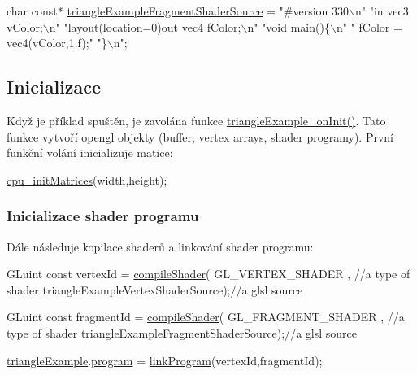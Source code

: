 \begin{DoxyCodeInclude}
\textcolor{keywordtype}{char} \textcolor{keyword}{const}* \hyperlink{triangleExample_8c_a48b175665aab439caedaa0440a85462e}{triangleExampleFragmentShaderSource} = 
\textcolor{stringliteral}{"#version 330\(\backslash\)n"}
\textcolor{stringliteral}{"in vec3 vColor;\(\backslash\)n"}
\textcolor{stringliteral}{"layout(location=0)out vec4 fColor;\(\backslash\)n"}
\textcolor{stringliteral}{"void main()\{\(\backslash\)n"}
\textcolor{stringliteral}{"  fColor = vec4(vColor,1.f);"}
\textcolor{stringliteral}{"\}\(\backslash\)n"};
\end{DoxyCodeInclude}
\hypertarget{triangleExample.c_Initialization}{}\subsection{Inicializace}\label{triangleExample.c_Initialization}
Když je příklad spuštěn, je zavolána funkce \hyperlink{triangleExample_8c_a73184b4ab6bb513ad9a9a4c36e92646b}{triangle\-Example\-\_\-on\-Init()}. Tato funkce vytvoří opengl objekty (buffer, vertex arrays, shader programy). První funkční volání inicializuje matice\-: 
\begin{DoxyCodeInclude}
  \hyperlink{mouseCamera_8c_a7e7e918a9328502b7c35cfbbdb068b7b}{cpu\_initMatrices}(width,height);
\end{DoxyCodeInclude}
\hypertarget{triangleExample.c_ShaderProgram}{}\subsubsection{Inicializace shader programu}\label{triangleExample.c_ShaderProgram}
Dále následuje kopilace shaderů a linkování shader programu\-: 
\begin{DoxyCodeInclude}
  GLuint \textcolor{keyword}{const} vertexId = \hyperlink{program_8h_aeeb65abe90cc1be97e5788afe8ca57a7}{compileShader}(
      GL\_VERTEX\_SHADER                 , \textcolor{comment}{//a type of shader}
      triangleExampleVertexShaderSource);\textcolor{comment}{//a glsl source}

  GLuint \textcolor{keyword}{const} fragmentId = \hyperlink{program_8h_aeeb65abe90cc1be97e5788afe8ca57a7}{compileShader}(
      GL\_FRAGMENT\_SHADER                 , \textcolor{comment}{//a type of shader}
      triangleExampleFragmentShaderSource);\textcolor{comment}{//a glsl source}

  \hyperlink{triangleExample_8c_af82b723635ac0c90962571915a1b1163}{triangleExample}.\hyperlink{structTriangleExampleVariables_abc287e489a25d4e3c4ad1899d183881d}{program} = \hyperlink{program_8h_af917a75fb9e573fb52d85ef90f32231e}{linkProgram}(vertexId,fragmentId);
\end{DoxyCodeInclude}
